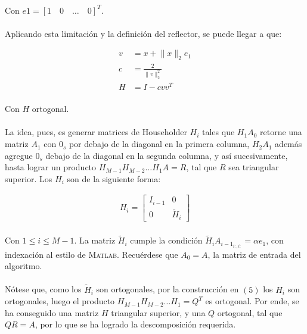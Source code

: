 \documentclass[12pt, twocolumn]{article}
\begin{document}
	\paragraph{}Con $e1 = \left[1\quad0\quad\dots\quad0\right]^{T}$.
	
	\paragraph{} Aplicando esta limitación y la definición del reflector, se puede llegar a que:
	
	\begin{align}
		v &= x + \lVert x \rVert _{2}e_{1} \\
		c &= \frac{2}{\lVert v \rVert _{2}^{2}} \\
		H &= I - cvv^{T}
	\end{align}
	\paragraph{}Con $H$ ortogonal.
	
	\paragraph{} La idea, pues, es generar matrices de Householder $H_{i}$ tales que $H_{1}A_{0}$ retorne una matriz $A_{1}$ con $0_{s}$ por debajo de la diagonal en la primera columna, $H_{2}A_{1}$ además agregue $0_{s}$ debajo de la diagonal en la segunda columna, y así sucesivamente, hasta lograr un producto $H_{M-1}H_{M-2}\dots H_{1}A = R$, tal que $R$ sea triangular superior. Los $H_{i}$ son de la siguiente forma:
	
	\begin{align}
	H_{i} = \begin{bmatrix} 
	I_{i-1} & 0 	   \\
	0 	   & \widetilde{H}_{i}         
	\end{bmatrix}
	\end{align}
	
	
	\paragraph{} Con $1 \le i \le M-1$. La matriz $\widetilde{H}_{i}$ cumple la condición $\widetilde{H}_{i}A_{i-1_{i:,i:}} = \alpha e_{1}$, con indexación al estilo de \textsc{Matlab}. Recuérdese que $A_{0} = A$, la matriz de entrada del algoritmo.
	
	\paragraph{} Nótese que, como los $\widetilde{H}_{i}$ son ortogonales, por la construcción en $(5)$ los $H_{i}$ son ortogonales, luego el producto $H_{M-1}H_{M-2}\dots H_{1} = Q^{T}$ es ortogonal. Por ende, se ha conseguido una matriz $H$ triangular superior, y una $Q$ ortogonal, tal que $QR = A$, por lo que se ha logrado la descomposición requerida. 
	
\end{document}
